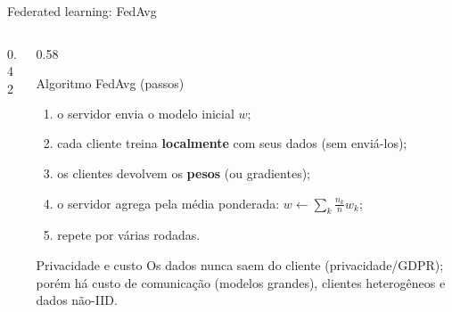 \documentclass[aspectratio=169,11pt]{beamer}
\begin{document}
\begin{frame}{Federated learning: FedAvg}
  \begin{columns}
    \begin{column}{0.42\textwidth}
      \begin{center}
      \end{center}
    \end{column}
    \begin{column}{0.58\textwidth}
      \begin{block}{Algoritmo FedAvg (passos)}
        \begin{enumerate}
          \item o servidor envia o modelo inicial $w$;
          \item cada cliente treina \textbf{localmente} com seus dados (sem enviá-los);
          \item os clientes devolvem os \textbf{pesos} (ou gradientes);
          \item o servidor agrega pela média ponderada: $w \leftarrow \sum_k \frac{n_k}{n} w_k$;
          \item repete por várias rodadas.
        \end{enumerate}
      \end{block}
      \pause
      \begin{alertblock}{Privacidade e custo}
        Os dados nunca saem do cliente (privacidade/GDPR); porém há custo de comunicação (modelos grandes), clientes heterogêneos e dados não-IID.
      \end{alertblock}
    \end{column}
  \end{columns}
\end{frame}
\end{document}
